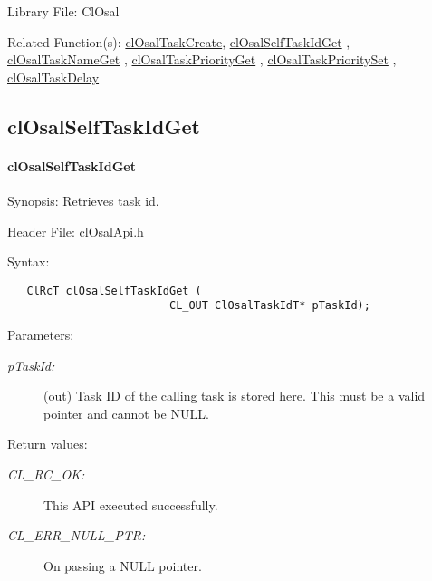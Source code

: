 \begin{Desc}
\item[Library File:]Cl\-Osal\end{Desc}
\begin{Desc}
\item[Related Function(s):]\hyperlink{pageosal103}{cl\-Osal\-Task\-Create}, \hyperlink{pageosal105}{cl\-Osal\-Self\-Task\-Id\-Get} , 
\hyperlink{pageosal106}{cl\-Osal\-Task\-Name\-Get} , \hyperlink{pageosal107}{cl\-Osal\-Task\-Priority\-Get} , 
\hyperlink{pageosal108}{cl\-Osal\-Task\-Priority\-Set} , \hyperlink{pageosal109}{cl\-Osal\-Task\-Delay} \end{Desc}

\newpage
\subsection{clOsalSelfTaskIdGet}
\hypertarget{pageosal105}{}\paragraph{cl\-Osal\-Self\-Task\-Id\-Get}\label{pageosal105}
\begin{Desc}
\item[Synopsis:]Retrieves task id.\end{Desc}
\begin{Desc}
\item[Header File:]clOsalApi.h\end{Desc}
\begin{Desc}
\item[Syntax:]

\footnotesize\begin{verbatim}   ClRcT clOsalSelfTaskIdGet (
                         CL_OUT ClOsalTaskIdT* pTaskId);
\end{verbatim}
\normalsize
\end{Desc}
\begin{Desc}
\item[Parameters:]
\begin{description}
\item[{\em p\-Task\-Id:}](out) Task ID of the calling task is stored here. This must be a valid pointer and cannot be NULL.\end{description}
\end{Desc}
\begin{Desc}
\item[Return values:]
\begin{description}
\item[{\em CL\_\-RC\_\-OK:}]This API executed successfully. \item[{\em CL\_\-ERR\_\-NULL\_\-PTR:}]On passing a NULL pointer.\end{description}
\end{Desc}
